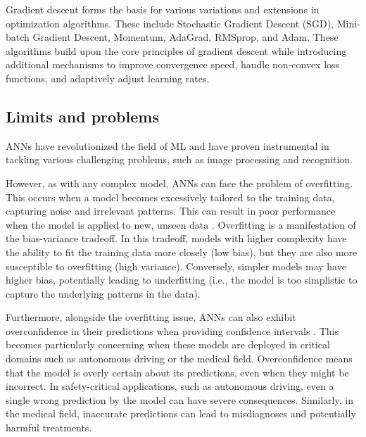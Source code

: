 Gradient descent forms the basis for various variations and extensions in optimization algorithms. These include Stochastic Gradient Descent (SGD), Mini-batch Gradient Descent, Momentum, AdaGrad, RMSprop, and Adam. These algorithms build upon the core principles of gradient descent while introducing additional mechanisms to improve convergence speed, handle non-convex loss functions, and adaptively adjust learning rates.

\subsection{Limits and problems}

ANNs have revolutionized the field of ML and have proven instrumental in tackling various challenging problems, such as image processing and recognition.

However, as with any complex model, ANNs can face the problem of overfitting. This occurs when a model becomes excessively tailored to the training data, capturing noise and irrelevant patterns. This can result in poor performance when the model is applied to new, unseen data \cite{James2013}.
Overfitting is a manifestation of the bias-variance tradeoff. In this tradeoff, models with higher complexity have the ability to fit the training data more closely (low bias), but they are also more susceptible to overfitting (high variance). Conversely, simpler models may have higher bias, potentially leading to underfitting (i.e., the model is too simplistic to capture the underlying patterns in the data).

Furthermore, alongside the overfitting issue, ANNs can also exhibit overconfidence in their predictions when providing confidence intervals \cite{9756596}. This becomes particularly concerning when these models are deployed in critical domains such as autonomous driving or the medical field.
Overconfidence means that the model is overly certain about its predictions, even when they might be incorrect. In safety-critical applications, such as autonomous driving, even a single wrong prediction by the model can have severe consequences. Similarly, in the medical field, inaccurate predictions can lead to misdiagnoses and potentially harmful treatments.
